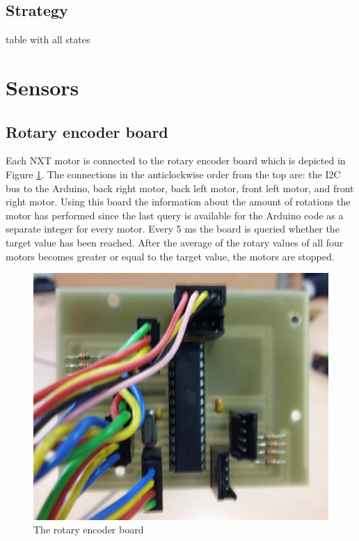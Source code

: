 \documentclass[a4paper,12pt]{article}
\begin{document}
\subsection{Strategy}

table with all states

\section{Sensors}
\subsection{Rotary encoder board}

Each NXT motor is connected to the rotary encoder board which is depicted in Figure \ref{fig:rotary}. The connections in the anticlockwise order from the top are: the I2C bus to the Arduino, back right motor, back left motor, front left motor, and front right motor. Using this board the information about the amount of rotations the motor has performed since the last query is available for the Arduino code as a separate integer for every motor. Every 5 ms the board is queried whether the target value has been reached. After the average of the rotary values of all four motors becomes greater or equal to the target value, the motors are stopped.

\begin{figure}[ht!]
\centering
\includegraphics[scale=.1]{rotary1}
\caption{The rotary encoder board}
\label{fig:rotary}
\end{figure}
\end{document}
